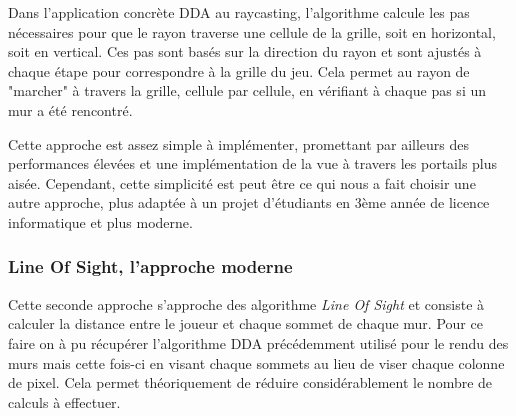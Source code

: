 \documentclass[12pt]{report}
\begin{document}
Dans l'application concrète DDA au raycasting, l'algorithme calcule les pas nécessaires pour que le rayon 
traverse une cellule de la grille, soit en horizontal, soit en vertical. Ces pas sont basés sur la direction du 
rayon et sont ajustés à chaque étape pour correspondre à la grille du jeu. Cela permet au rayon de "marcher" à travers 
la grille, cellule par cellule, en vérifiant à chaque pas si un mur a été rencontré.

\noindent Cette approche est assez simple à implémenter, promettant par ailleurs des performances élevées et 
une implémentation de la vue à travers les portails plus aisée. Cependant, cette simplicité est peut être ce qui 
nous a fait choisir une autre approche, plus adaptée à un projet d'étudiants en 3ème année de licence informatique et plus moderne.
 
\subsubsection{Line Of Sight, l'approche moderne}

Cette seconde approche s'approche des algorithme \textit{Line Of Sight} et consiste à calculer la distance entre le 
joueur et chaque sommet de chaque mur.
Pour ce faire on à pu récupérer l'algorithme DDA précédemment utilisé pour le rendu des murs mais cette fois-ci 
en visant chaque sommets au lieu de viser chaque colonne de pixel. Cela permet théoriquement de réduire considérablement 
le nombre de calculs à effectuer.
\end{document}
